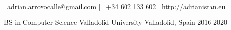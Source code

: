 \documentclass[]{awesome-cv}
\begin{document}
\begin{minipage}[b]{0.66666\textwidth}
\begin{center}
	  \\
	\vspace{2mm}
	{\faEnvelope\ adrian.arroyocalle@gmail.com} | {\faMobile\ +34 602 133 602}  {\faLink\ \url{http://adrianistan.eu}}
\end{center}
\end{minipage}

\begin{cventries}
	\cventry
	{BS in Computer Science}
	{Valladolid University}
	{Valladolid, Spain}
	{2016-2020}
	{}
\end{cventries}
\end{document}
